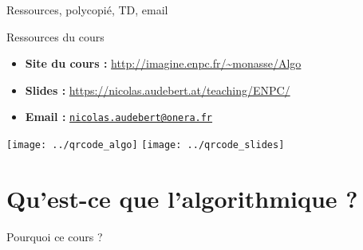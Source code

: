 
\date[31 jan. 2018]{Mercredi 31 janvier 2018}
\subtitle{Complexité et structures de données}
\maketitle

\begin{frame}{Ressources, polycopié, TD, email}

\begin{block}{Ressources du cours}
    \begin{itemize}
    \item \textbf{Site du cours :} \url{http://imagine.enpc.fr/~monasse/Algo}
    \item \textbf{Slides :} \url{https://nicolas.audebert.at/teaching/ENPC/}
    \item \textbf{Email :} \href{mailto:nicolas.audebert@onera.fr}{\texttt{nicolas.audebert@onera.fr}}
    \end{itemize}
\end{block}

\centering
\texttt{[image: ../qrcode\_algo]}
\texttt{[image: ../qrcode\_slides]}

\end{frame}

\section{Qu'est-ce que l'algorithmique ?}
\begin{frame}{Pourquoi ce cours ?}



\end{frame}

